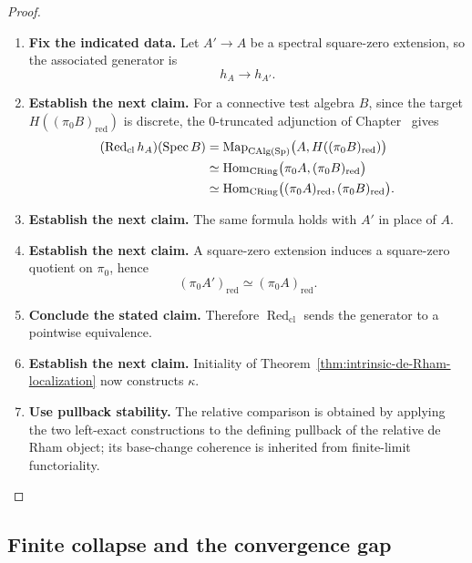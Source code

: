 \begin{proof}
\leavevmode
\begin{enumerate}[label=\textup{(\arabic*)}]
    \item \textbf{Fix the indicated data.}
    Let \(A'\to A\) be a spectral square-zero extension, so the associated
    generator is
    \[
    h_A\longrightarrow h_{A'}.
    \]
    \item \textbf{Establish the next claim.}
    For a connective test algebra \(B\), since the target
    \(H((\pi_0B)_{\mathrm{red}})\) is discrete, the \(0\)-truncated adjunction of
    Chapter~ gives
    \[
    \begin{aligned}
    (\operatorname{Red}_{\mathrm{cl}}h_A)(\operatorname{Spec} B)
    &=
    \operatorname{Map}_{\operatorname{CAlg}(\operatorname{Sp})}\bigl(A,H((\pi_0B)_{\mathrm{red}})\bigr)\\
    &\simeq
    \operatorname{Hom}_{\mathrm{CRing}}
    \bigl(\pi_0A,(\pi_0B)_{\mathrm{red}}\bigr)\\
    &\simeq
    \operatorname{Hom}_{\mathrm{CRing}}
    \bigl((\pi_0A)_{\mathrm{red}},(\pi_0B)_{\mathrm{red}}\bigr).
    \end{aligned}
    \]
    \item \textbf{Establish the next claim.}
    The same formula holds with \(A'\) in place of \(A\).
    \item \textbf{Establish the next claim.}
    A square-zero extension
    induces a square-zero quotient on \(\pi_0\), hence
    \[
    (\pi_0A')_{\mathrm{red}}
    \simeq
    (\pi_0A)_{\mathrm{red}}.
    \]
    \item \textbf{Conclude the stated claim.}
    Therefore \(\operatorname{Red}_{\mathrm{cl}}\) sends the generator to a pointwise equivalence.
    \item \textbf{Establish the next claim.}
    Initiality of Theorem~\ref{thm:intrinsic-de-Rham-localization} now constructs
    \(\kappa\).
    \item \textbf{Use pullback stability.}
    The relative comparison is obtained by applying the two left-exact
    constructions to the defining pullback of the relative de Rham object; its
    base-change coherence is inherited from finite-limit functoriality.
\end{enumerate}
\end{proof}

\subsection{Finite collapse and the convergence gap}

